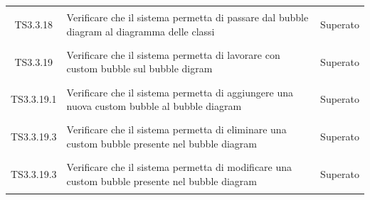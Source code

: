 \documentclass[../PianoDiQualifica.tex]{subfiles}
\begin{document}
\begin{longtable}{|c|>{\centering}p{10cm}|c|}
	\hline
	\hypertarget{TS3.3.18}{TS3.3.18} & Verificare che il sistema permetta di passare dal bubble diagram al diagramma delle classi & Superato \\
	\hypertarget{TS3.3.19}{TS3.3.19} & Verificare che il sistema permetta di lavorare con custom bubble sul bubble digram & Superato \\
	\hline
	\hypertarget{TS3.3.19.1}{TS3.3.19.1} & Verificare che il sistema permetta di aggiungere una nuova custom bubble al bubble diagram & Superato \\
	\hline
	\hypertarget{TS3.3.19.3}{TS3.3.19.3} & Verificare che il sistema permetta di eliminare una custom bubble presente nel bubble diagram &Superato \\
	\hline
	\hypertarget{TS3.3.19.3}{TS3.3.19.3} & Verificare che il sistema permetta di modificare una custom bubble presente nel bubble diagram &Superato \\
	

\end{longtable}
\end{document}

